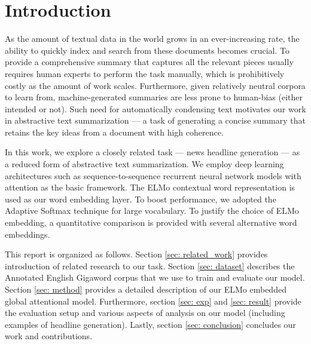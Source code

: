 \section{Introduction}

As the amount of textual data in the world grows in an ever-increasing rate, the ability to quickly index and search from these documents becomes crucial. To provide a comprehensive summary that captures all the relevant pieces usually requires human experts to perform the task manually, which is prohibitively costly as the amount of work scales. Furthermore, given relatively neutral corpora to learn from, machine-generated summaries are less prone to human-bias (either intended or not). Such need for automatically condensing text motivates our work in abstractive text summarization --- a task of generating a concise summary that retains the key ideas from a document with high coherence. 

In this work, we explore a closely related task --- news headline generation --- as a reduced form of abstractive text summarization. We employ deep learning architectures such as sequence-to-sequence recurrent neural network models with attention as the basic framework. The ELMo contextual word representation \cite{peters2018deep} is used as our word embedding layer. To boost performance, we adopted the Adaptive Softmax technique \cite{grave2016efficient} for large vocabulary. To justify the choice of ELMo embedding, a quantitative comparison is provided with several alternative word embeddings. 


This report is organized as follows. Section \ref{sec: related_work} provides introduction of related research to our task. Section \ref{sec: dataset} describes the Annotated English Gigaword corpus \cite{graff2003english} that we use to train and evaluate our model. Section \ref{sec: method} provides a detailed description of our ELMo embedded global attentional model. Furthermore, section \ref{sec: exp} and \ref{sec: result} provide the evaluation setup and various aspects of analysis on our model (including examples of headline generation). Lastly, section \ref{sec: conclusion} concludes our work and contributions. 

